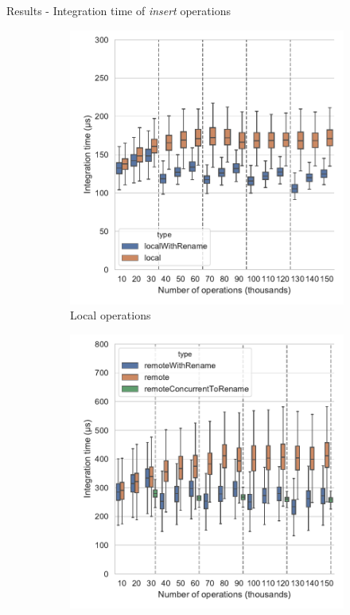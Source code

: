 \documentclass[10pt]{beamer}
\begin{document}
\begin{frame}{Results - Integration time of \emph{insert} operations}
  \begin{figure}
    \captionsetup[subfigure]{aboveskip=-1pt,belowskip=-1pt}
    \centering
    \begin{subfigure}{0.47\textwidth}
        \includegraphics[width=1\textwidth]{img/integration-time-boxplot-local-operations-without-outliers.pdf}
        \caption{Local operations}
        \label{fig:evolution-integration-time-local-insert-remove}
    \end{subfigure}
    \begin{subfigure}{0.47\textwidth}
        \includegraphics[width=1\textwidth]{img/integration-time-boxplot-remote-operations-without-outliers.pdf}

\end{subfigure}
\end{figure}
\end{frame}
\end{document}
